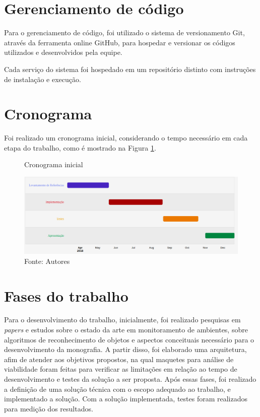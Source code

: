 \documentclass[]{politex}
\begin{document}
\section{Gerenciamento de código}
Para o gerenciamento de código, foi utilizado o sistema de versionamento Git, através da ferramenta online GitHub, para hospedar e versionar os códigos utilizados e desenvolvidos pela equipe.

Cada serviço do sistema foi hospedado em um repositório distinto com instruções de instalação e execução.

\section{Cronograma}
Foi realizado um cronograma inicial, considerando o tempo necessário em cada etapa do trabalho, como é mostrado na Figura \ref{fig:cronograma}.

\begin{figure}[H]
    \centering
    \caption{Cronograma inicial}
    \includegraphics[width=\textwidth]{metodologia_gantt}
    \caption*{Fonte: Autores}
    \label{fig:cronograma}
\end{figure}

\section{Fases do trabalho}
Para o desenvolvimento do trabalho, inicialmente, foi realizado  pesquisas em \textit{papers} e estudos sobre o estado da arte em monitoramento de ambientes, sobre algoritmos de reconhecimento de objetos e aspectos conceituais necessário para o desenvolvimento da monografia. A partir disso, foi elaborado uma arquitetura, afim de atender aos objetivos propostos, na qual maquetes para análise de viabilidade foram feitas para verificar as limitações em relação ao tempo de desenvolvimento e testes da solução a ser proposta. Após essas fases, foi realizado a definição de uma solução técnica com o escopo adequado ao trabalho, e implementado a solução. Com a solução implementada, testes foram realizados para medição dos resultados.
\end{document}
